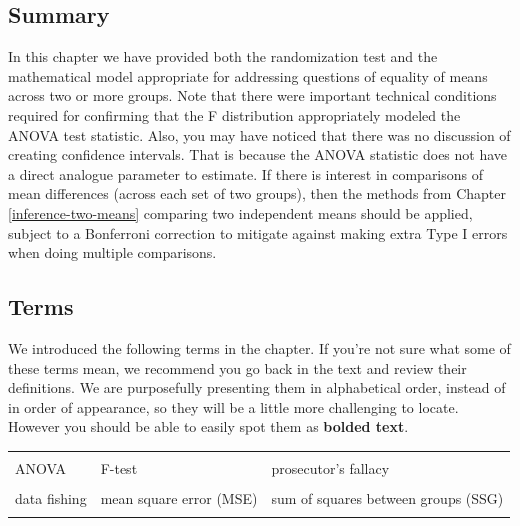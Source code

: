 \documentclass[
  10pt,
  openany]{book}
\begin{document}
\hypertarget{summary-14}{%
\subsection{Summary}\label{summary-14}}

In this chapter we have provided both the randomization test and the mathematical model appropriate for addressing questions of equality of means across two or more groups.
Note that there were important technical conditions required for confirming that the F distribution appropriately modeled the ANOVA test statistic.
Also, you may have noticed that there was no discussion of creating confidence intervals.
That is because the ANOVA statistic does not have a direct analogue parameter to estimate.
If there is interest in comparisons of mean differences (across each set of two groups), then the methods from Chapter \ref{inference-two-means} comparing two independent means should be applied, subject to a Bonferroni correction to mitigate against making extra Type I errors when doing multiple comparisons.

\hypertarget{terms-14}{%
\subsection{Terms}\label{terms-14}}

We introduced the following terms in the chapter.
If you're not sure what some of these terms mean, we recommend you go back in the text and review their definitions.
We are purposefully presenting them in alphabetical order, instead of in order of appearance, so they will be a little more challenging to locate.
However you should be able to easily spot them as \textbf{bolded text}.

\begin{tabu} to 
\toprule
{} &  & \\
ANOVA & F-test & prosecutor's fallacy\\
 &  & \\
data fishing & mean square error (MSE) & sum of squares between groups (SSG)\\
 &  & \\
\bottomrule
\end{tabu}
\end{document}
